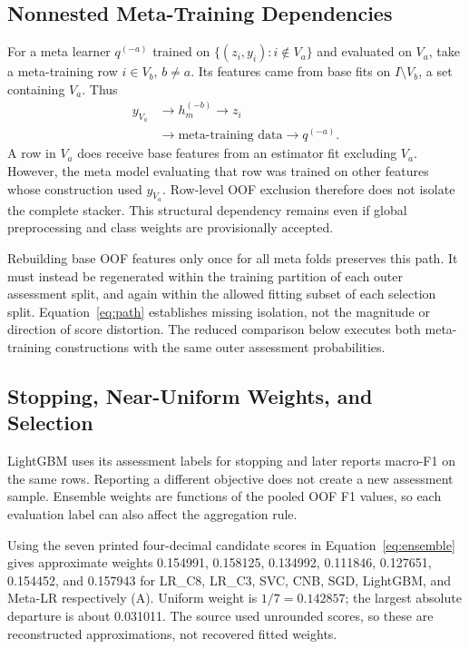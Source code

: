 \documentclass[doublecolumn]{ijcvsplatex}
\begin{document}
\subsection{Nonnested Meta-Training Dependencies}
For a meta learner $q^{(-a)}$ trained on $\{(z_i,y_i):i\notin V_a\}$ and evaluated on $V_a$, take a meta-training row $i\in V_b$, $b\ne a$. Its features came from base fits on $I\setminus V_b$, a set containing $V_a$. Thus
\begin{equation}
\begin{aligned}
y_{V_a}&\longrightarrow h_m^{(-b)}\longrightarrow z_i\\
&\longrightarrow\text{meta-training data}\longrightarrow q^{(-a)}.
\end{aligned}
\label{eq:path}
\end{equation}
A row in $V_a$ does receive base features from an estimator fit excluding $V_a$. However, the meta model evaluating that row was trained on other features whose construction used $y_{V_a}$. Row-level OOF exclusion therefore does not isolate the complete stacker. This structural dependency remains even if global preprocessing and class weights are provisionally accepted.

Rebuilding base OOF features only once for all meta folds preserves this path. It must instead be regenerated within the training partition of each outer assessment split, and again within the allowed fitting subset of each selection split. Equation~\ref{eq:path} establishes missing isolation, not the magnitude or direction of score distortion. The reduced comparison below executes both meta-training constructions with the same outer assessment probabilities.

\subsection{Stopping, Near-Uniform Weights, and Selection}
LightGBM uses its assessment labels for stopping and later reports macro-F1 on the same rows. Reporting a different objective does not create a new assessment sample. Ensemble weights are functions of the pooled OOF F1 values, so each evaluation label can also affect the aggregation rule.

Using the seven printed four-decimal candidate scores in Equation~\ref{eq:ensemble} gives approximate weights 0.154991, 0.158125, 0.134992, 0.111846, 0.127651, 0.154452, and 0.157943 for LR\_C8, LR\_C3, SVC, CNB, SGD, LightGBM, and Meta-LR respectively (A). Uniform weight is $1/7=0.142857$; the largest absolute departure is about 0.031011. The source used unrounded scores, so these are reconstructed approximations, not recovered fitted weights.
\end{document}
